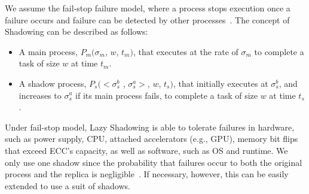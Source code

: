 We assume the
fail-stop failure model, where a process stops execution once a failure
occurs and failure can be detected by other
processes~\cite{gartner_faults_1999,cristian_comm_1991}.
The concept of Shadowing can be described as follows:
\begin{itemize}
	\item A main process, $P_m(\sigma_m$, $w$, $t_m)$, that executes at the rate of $\sigma_m$ to complete a task of size $w$ at time $t_m$.
	\item A shadow process, $P_s(<\sigma_s^b$ , $\sigma_s^a>$, $w$, $t_s)$, that initially executes at $\sigma_s^b$, and increases to $\sigma_s^a$ if its main process fails, to complete a task of size $w$ at time $t_s$.%
\end{itemize}

Under fail-stop model, Lazy Shadowing is able to tolerate failures in hardware, such as power supply, CPU, attached accelerators (e.g., GPU), memory bit flips that exceed ECC's capacity, as well as software, such as OS and runtime. 
We only use one shadow since the probability that failures occur to both the original process and the replica is negligible~\cite{casanova_inria_2012}. 
If necessary, however, this can be easily extended to use a suit of shadows. 



